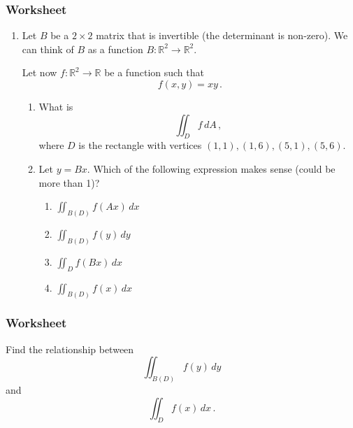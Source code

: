 \documentclass[aspectratio=169]{beamer}
\newcommand{\R}{\mathbb{R}}
\begin{document}
\begin{frame}
    \frametitle{Worksheet}
    \begin{enumerate}
        \item Let $B$ be a $2\times 2$ matrix that is invertible (the determinant is non-zero).
        We can think of $B$ as a function $B: \R^2 \to \R^2$.

        Let now $f:\R^2 \to \R$ be a function such that
        \begin{equation*}
            f(x,y) = xy \,.
        \end{equation*}
        \begin{enumerate}
            \item What is 
                \begin{equation*}
                    \iint_D f \, dA \,,
                \end{equation*}
                where $D$ is the rectangle with vertices $(1,1), (1,6), (5,1), (5,6)$.
            \item Let $y = Bx$.
                Which of the following expression makes sense (could be more than 1)?
                \begin{enumerate}
                    \item $\iint_{B(D)} f(Ax) \, dx$
                    \item $\iint_{B(D)} f(y) \, dy$
                    \item $\iint_{D} f(Bx) \, dx$
                    \item $\iint_{B(D)} f(x) \, dx$
                \end{enumerate}
        \end{enumerate}
    \end{enumerate}
\end{frame}

\begin{frame}
    \frametitle{Worksheet}
    Find the relationship between
    \begin{equation*}
        \iint_{B(D)} f(y) \, dy 
    \end{equation*}
    and
    \begin{equation*}
        \iint_D f(x) \, dx \,.
    \end{equation*}
\end{frame}
\end{document}
